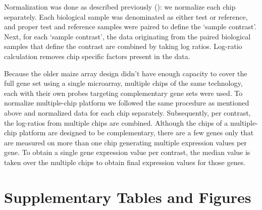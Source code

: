 Normalization was done as described previously (\cite{Engelen2011}): 
we normalize each chip separately.  Each biological sample
was denominated as either test or reference, and proper test and
reference samples were paired to define the ‘sample
contrast’. Next, for each ‘sample contrast’, the data originating
from the paired biological samples that define the contrast are
combined by taking log ratios. Log-ratio calculation removes chip
specific factors present in the data.

Because the older maize array design didn’t have enough capacity
to cover the full gene set using a single microarray, multiple
chips of the same technology, each with their own probes
targeting complementary gene sets were used. To normalize
multiple-chip platform we followed the same procedure as
mentioned above and normalized data for each chip
separately. Subsequently, per contrast, the log-ratios from
multiple chips are combined. Although the chips of a
multiple-chip platform are designed to be complementary, there
are a few genes only that are measured on more than one chip
generating multiple expression values per gene. To obtain a
single gene expression value per contrast, the median value is
taken over the multiple chips to obtain final expression values
for those genes.


\newpage
\section{Supplementary Tables and Figures}


